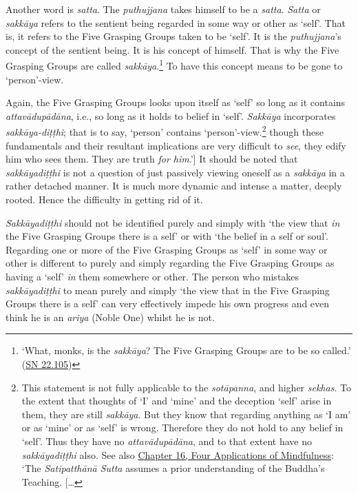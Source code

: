 Another word is \textit{satta}. The \textit{puthujjana} takes himself to be a \textit{satta}. \textit{Satta} or \textit{sakkāya} refers to the sentient being regarded in some way or other as `self'. That is, it refers to the Five Grasping Groups taken to be `self'. It is the \textit{puthujjana}'s concept of the sentient being. It is his concept of himself. That is why the Five Grasping Groups are called \textit{sakkāya}.\footnote{`What, monks, is the \textit{sakkāya}? The Five Grasping Groups are to be so called.' (\href{https://suttacentral.net/sn22.105/en/sujato}{SN 22.105})} To have this concept means to be gone to `person'-view.

Again, the Five Grasping Groups looks upon itself as `self' so long as it contains \textit{attavādupādāna}, i.e., so long as it holds to belief in `self'. \textit{Sakkāya} incorporates \textit{sakkāya-diṭṭhi}; that is to say, `person' contains `person'-view.\footnote{This statement is not fully applicable to the \textit{sotāpanna}, and higher \textit{sekhas}. To the extent that thoughts of `I' and `mine' and the deception `self' arise in them, they are still \textit{sakkāya}. But they know that regarding anything as `I am' or as `mine' or as `self' is wrong. Therefore they do not hold to any belief in `self'. Thus they have no \textit{attavādupādāna}, and to that extent have no \textit{sakkāyadiṭṭhi} also. See also \href{ch-16-satipatthana.xml\#truth-for-him}{Chapter 16, Four Applications of Mindfulness}: `The \textit{Satipatthānā Sutta} assumes a prior understanding of the Buddha's Teaching. {[}\ldots\hspace{0pt}} though these fundamentals and their resultant implications are very difficult to \emph{see}, they edify him who sees them. They are truth \emph{for him}.'{]} It should be noted that \textit{sakkāyadiṭṭhi} is not a question of just passively viewing oneself as a \textit{sakkāya} in a rather detached manner. It is much more dynamic and intense a matter, deeply rooted. Hence the difficulty in getting rid of it.

\textit{Sakkāyadiṭṭhi} should not be identified purely and simply with `the view that \emph{in} the Five Grasping Groups there is a self' or with `the belief in a self or soul'. Regarding one or more of the Five Grasping Groups as `self' in some way or other is different to purely and simply regarding the Five Grasping Groups as having a `self' \emph{in} them somewhere or other. The person who mistakes \textit{sakkāyadiṭṭhi} to mean purely and simply `the view that in the Five Grasping Groups there is a self' can very effectively impede his own progress and even think he is an \textit{ariya} (Noble One) whilst he is not.

